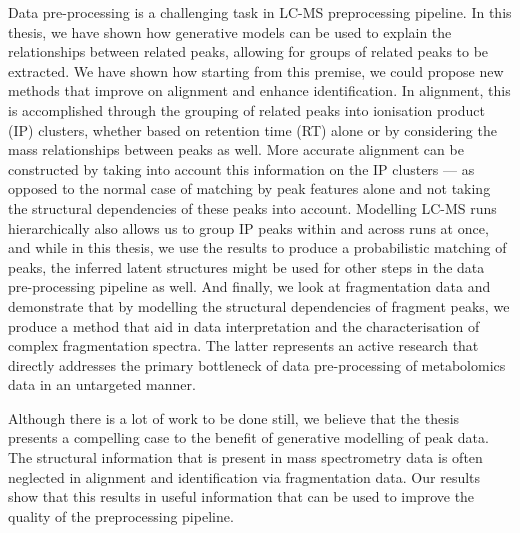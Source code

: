 Data pre-processing is a challenging task in LC-MS preprocessing pipeline. In this thesis, we have shown how generative models can be used to explain the relationships between related peaks, allowing for groups of related peaks to be extracted. We have shown how starting from this premise, we could propose new methods that improve on alignment and enhance identification. In alignment, this is accomplished through the grouping of related peaks into ionisation product (IP) clusters, whether based on retention time (RT) alone or by considering the mass relationships between peaks as well. More accurate alignment can be constructed by taking into account this information on the IP clusters --- as opposed to the normal case of matching by peak features alone and not taking the structural dependencies of these peaks into account. Modelling LC-MS runs hierarchically also allows us to group IP peaks within and across runs at once, and while in this thesis, we use the results to produce a probabilistic matching of peaks, the inferred latent structures might be used for other steps in the data pre-processing pipeline as well. And finally, we look at fragmentation data and demonstrate that by modelling the structural dependencies of fragment peaks, we produce a method that aid in data interpretation and the characterisation of complex fragmentation spectra. The latter represents an active research that directly addresses the primary bottleneck of data pre-processing of metabolomics data in an untargeted manner.

Although there is a lot of work to be done still, we believe that the thesis presents a compelling case to the benefit of generative modelling of peak data. The structural information that is present in mass spectrometry data is often neglected in alignment and identification via fragmentation data. Our results show that this results in useful information that can be used to improve the quality of the preprocessing pipeline.